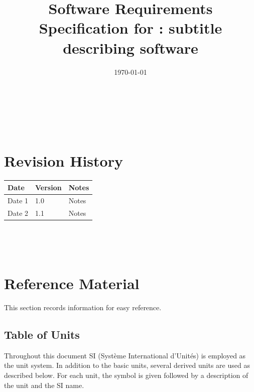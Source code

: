 \documentclass[12pt]{article}
\begin{document}
\title{Software Requirements Specification for \progname: subtitle describing software} 
\author{\authname}
\date{\today}
	
\maketitle

~\newpage


\tableofcontents

~\newpage

\section*{Revision History}

\begin{tabularx}{\textwidth}{p{3cm}p{2cm}X}
\toprule {\bf Date} & {\bf Version} & {\bf Notes}\\
\midrule
Date 1 & 1.0 & Notes\\
Date 2 & 1.1 & Notes\\
\bottomrule
\end{tabularx}

~\\

~\newpage

\section{Reference Material}

This section records information for easy reference.

\subsection{Table of Units}

Throughout this document SI (Syst\`{e}me International d'Unit\'{e}s) is employed
as the unit system.  In addition to the basic units, several derived units are
used as described below.  For each unit, the symbol is given followed by a
description of the unit and the SI name.
~\newline
\end{document}
